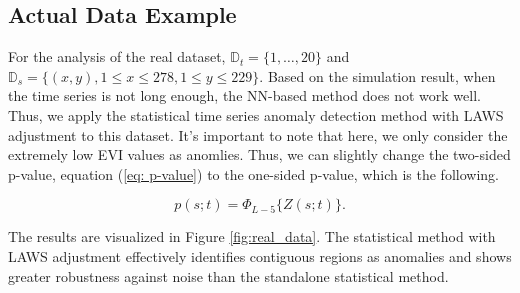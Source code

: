 \documentclass[11pt]{article}
\begin{document}
%     
%
%
%
%     
%  


\subsection{Actual Data Example}
For the analysis of the real dataset, $\mathbb{D}_t=\{1, \ldots, 20\}$ and $\mathbb{D}_s=\{(x, y), 1 \leq x \leq 278, 1 \leq y \leq 229\}$. Based on the simulation result, when the time series is not long enough, the NN-based method does not work well. Thus, we apply the statistical time series anomaly detection method with LAWS adjustment to this dataset. It's important to note that here, we only consider the extremely low EVI values as anomlies. Thus, we can slightly change the two-sided p-value, equation (\ref{eq: p-value}) to the one-sided p-value, which is the following.

\begin{equation}\label{eq: one-sided p-value}
	p(s;t)= \Phi_{L-5}\{Z(s;t)\}.
\end{equation}

The results are visualized in Figure \ref{fig:real_data}. The statistical method with LAWS adjustment effectively identifies contiguous regions as anomalies and shows greater robustness against noise than the standalone statistical method.
\end{document}
